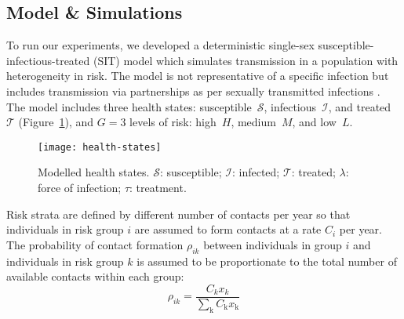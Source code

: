 \subsection{Model \& Simulations}\label{ss:model-sim}
To run our experiments,
we developed a deterministic single-sex susceptible-infectious-treated (SIT) model
which simulates transmission in a population with heterogeneity in risk.
The model is not representative of a specific infection
but includes transmission via partnerships
as per sexually transmitted infections \citep{Garnett1994}.
The model includes three health states:
susceptible~$\mathcal{S}$, infectious~$\mathcal{I}$, and treated~$\mathcal{T}$
(Figure~\ref{fig:health-states}),
and $G = 3$ levels of risk:
high~$H$, medium~$M$, and low~$L$.
\begin{figure}
  \centering
  \texttt{[image: health-states]}
  \caption{Modelled health states.
    $\mathcal{S}$: susceptible;
    $\mathcal{I}$: infected;
    $\mathcal{T}$: treated;
    $\lambda$: force of infection;
    $\tau$: treatment.}
  \label{fig:health-states}
\end{figure}
Risk strata are defined by different number of contacts per year
so that individuals in risk group $i$ are assumed to
form contacts at a rate $C_{i}$ per year.
The probability of contact formation $\rho_{ik}$ between individuals in group $i$
and individuals in risk group $k$ is assumed to be
proportionate to the total number of available contacts within each group:
\begin{equation}
\rho_{ik} = \frac
{C_k x_k}
{\sum_{\mathrm{k}}C_{\mathrm{k}} x_{\mathrm{k}}}
\label{eq:rho}
\end{equation}
